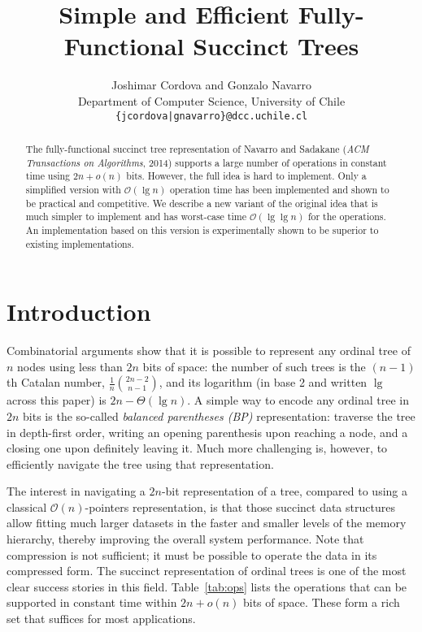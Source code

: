 \documentclass[11pt]{article}
\renewcommand{\log}{\lg}
\newcommand{\0}{\mathit{0}}
\newcommand{\1}{\mathit{1}}
\newcommand{\Oh}[1]{\mathcal{O}\!\left(#1\right)}
\begin{document}
\title{Simple and Efficient Fully-Functional Succinct Trees}

\author{Joshimar Cordova and Gonzalo Navarro \\
Department of Computer Science, University of Chile \\
{\tt \{jcordova|gnavarro\}@dcc.uchile.cl}}

\maketitle 

\begin{abstract}
The fully-functional succinct tree representation of Navarro and Sadakane
({\em ACM Transactions on Algorithms}, 2014) supports a large number of
operations in constant time using $2n+o(n)$ bits. 
However, the full idea is hard to implement. Only a simplified version with
$\Oh{\log n}$ operation time has been implemented and shown to be practical 
and competitive. We describe a new variant of the original idea that is much 
simpler to implement and has worst-case time $\Oh{\log\log n}$ for the 
operations. An implementation based on this version is experimentally shown to
be superior to existing implementations.
\end{abstract}

\section{Introduction}

Combinatorial arguments show that it is possible to represent any ordinal
tree of $n$ nodes using less than $2n$ bits of space: the number of such trees
is the $(n-1)$th Catalan number, $\frac{1}{n}{2n-2 \choose n-1}$, and its
logarithm (in base 2 and written $\lg$ across this paper) is $2n-\Theta(\log n)$. A simple way to
encode any ordinal tree in $2n$ bits is the so-called {\em balanced
parentheses (BP)} representation: traverse the tree in depth-first order,
writing an opening parenthesis upon reaching a node, and a closing one upon
definitely leaving it. Much more challenging is, however, to efficiently
navigate the tree using that representation.

The interest in navigating a $2n$-bit representation of a tree, compared to
using a classical $\Oh{n}$-pointers representation, is that those succinct
data structures allow fitting much larger datasets in the faster and
smaller levels of the memory hierarchy, thereby improving the overall system
performance. Note that compression is not sufficient; it must be possible to
operate the data in its compressed form. The succinct representation of 
ordinal trees is one of the most clear success stories in this field. 
Table~\ref{tab:ops} lists the operations that can be supported in constant 
time within $2n+o(n)$ bits of space. These form a rich set that suffices for
most applications.
\end{document}
